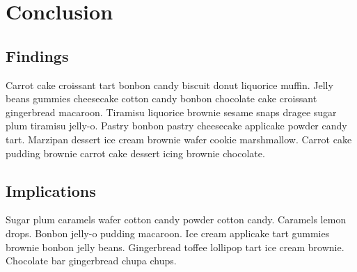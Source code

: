 \graphicspath{{9/figures/}}
\chapter{Conclusion}
\label{chp:conclusion}

\section{Findings}
Carrot cake croissant tart bonbon candy biscuit donut liquorice muffin. 
Jelly beans gummies cheesecake cotton candy bonbon chocolate cake croissant gingerbread macaroon. 
Tiramisu liquorice brownie sesame snaps dragee sugar plum tiramisu jelly-o. 
Pastry bonbon pastry cheesecake applicake powder candy tart. 
Marzipan dessert ice cream brownie wafer cookie marshmallow. 
Carrot cake pudding brownie carrot cake dessert icing brownie chocolate.


\section{Implications}

Sugar plum caramels wafer cotton candy powder cotton candy. 
Caramels lemon drops. 
Bonbon jelly-o pudding macaroon. 
Ice cream applicake tart gummies brownie bonbon jelly beans. 
Gingerbread toffee lollipop tart ice cream brownie.
Chocolate bar gingerbread chupa chups. 

